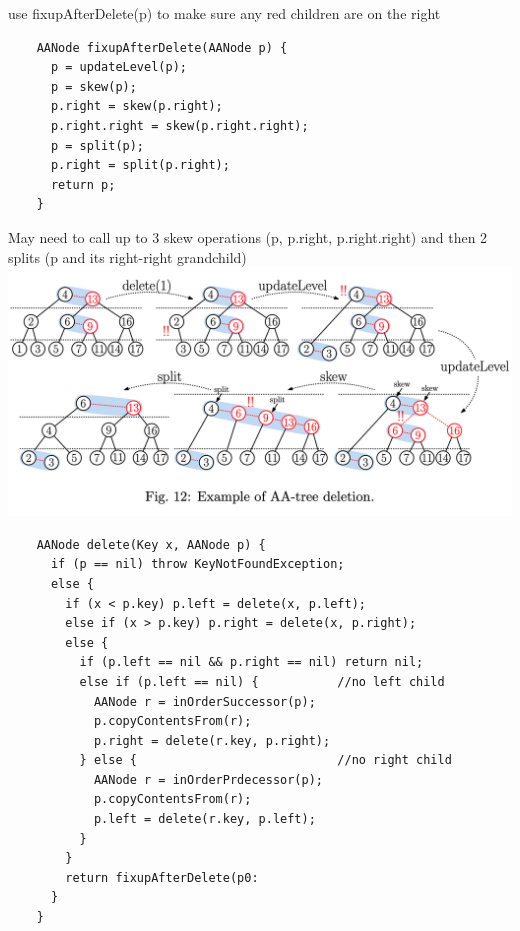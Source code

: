 \documentclass{article}
\begin{document}
  \indent use fixupAfterDelete(p) to make sure any red children are on the right \\
  \begin{lstlisting}
    AANode fixupAfterDelete(AANode p) {
      p = updateLevel(p);
      p = skew(p);
      p.right = skew(p.right);
      p.right.right = skew(p.right.right);
      p = split(p);
      p.right = split(p.right);
      return p;
    }
  \end{lstlisting}
  \indent May need to call up to 3 skew operations (p, p.right, p.right.right) and then 2 splits (p and its right-right grandchild) \\
  \includegraphics[width=\textwidth]{DeletionAATree}
  \begin{lstlisting}
    AANode delete(Key x, AANode p) {
      if (p == nil) throw KeyNotFoundException;
      else {
        if (x < p.key) p.left = delete(x, p.left);
        else if (x > p.key) p.right = delete(x, p.right);
        else {
          if (p.left == nil && p.right == nil) return nil;
          else if (p.left == nil) {           //no left child
            AANode r = inOrderSuccessor(p);
            p.copyContentsFrom(r);
            p.right = delete(r.key, p.right);
          } else {                            //no right child
            AANode r = inOrderPrdecessor(p);
            p.copyContentsFrom(r);
            p.left = delete(r.key, p.left);
          }
        }
        return fixupAfterDelete(p0:
      }
    }
  \end{lstlisting}
\end{document}
